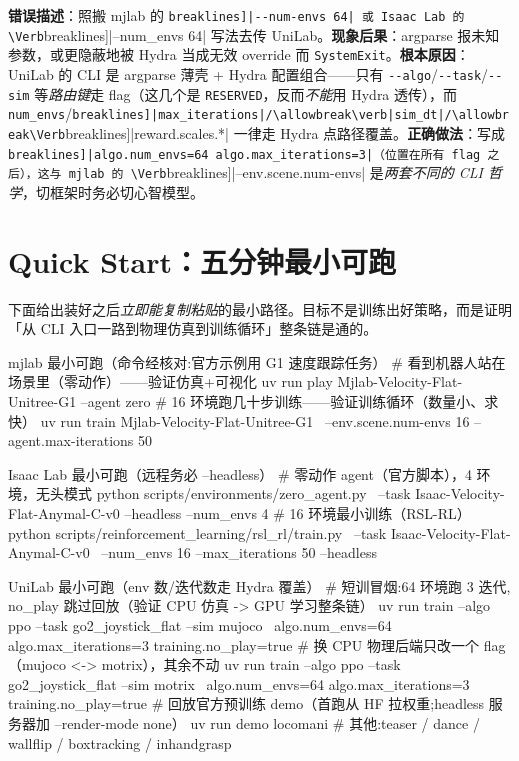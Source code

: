 \begin{pitfall}
\textbf{错误描述}：照搬 mjlab 的 \Verb[breaklines]|--num-envs 64| 或 Isaac Lab 的 \Verb[breaklines]|--num_envs 64| 写法去传 UniLab。\textbf{现象后果}：argparse 报未知参数，或更隐蔽地被 Hydra 当成无效 override 而 \verb|SystemExit|。\textbf{根本原因}：UniLab 的 CLI 是 argparse 薄壳 + Hydra 配置组合——只有 \verb|--algo|/\allowbreak\verb|--task|/\allowbreak\verb|--sim| 等\emph{路由键}走 flag（这几个是 \texttt{RESERVED}，反而\emph{不能}用 Hydra 透传），而 \verb|num_envs|/\allowbreak\Verb[breaklines]|max_iterations|/\allowbreak\verb|sim_dt|/\allowbreak\Verb[breaklines]|reward.scales.*| 一律走 Hydra 点路径覆盖。\textbf{正确做法}：写成 \Verb[breaklines]|algo.num_envs=64 algo.max_iterations=3|（位置在所有 flag 之后），这与 mjlab 的 \Verb[breaklines]|--env.scene.num-envs| 是\emph{两套不同的 CLI 哲学}，切框架时务必切心智模型。
\end{pitfall}

\section{Quick Start：五分钟最小可跑}
\label{sec:rlmc-setup-quickstart}

下面给出装好之后\emph{立即能复制粘贴}的最小路径。目标不是训练出好策略，而是证明「从 CLI 入口一路到物理仿真到训练循环」整条链是通的。

\begin{codebox}[bash]{mjlab 最小可跑（命令经核对:官方示例用 G1 速度跟踪任务）}
# 看到机器人站在场景里（零动作）——验证仿真+可视化
uv run play Mjlab-Velocity-Flat-Unitree-G1 --agent zero
# 16 环境跑几十步训练——验证训练循环（数量小、求快）
uv run train Mjlab-Velocity-Flat-Unitree-G1 \
    --env.scene.num-envs 16 --agent.max-iterations 50
\end{codebox}

\begin{codebox}[bash]{Isaac Lab 最小可跑（远程务必 --headless）}
# 零动作 agent（官方脚本），4 环境，无头模式
python scripts/environments/zero_agent.py \
    --task Isaac-Velocity-Flat-Anymal-C-v0 --headless --num_envs 4
# 16 环境最小训练（RSL-RL）
python scripts/reinforcement_learning/rsl_rl/train.py \
    --task Isaac-Velocity-Flat-Anymal-C-v0 \
    --num_envs 16 --max_iterations 50 --headless
\end{codebox}

\begin{codebox}[bash]{UniLab 最小可跑（env 数/迭代数走 Hydra 覆盖）}
# 短训冒烟:64 环境跑 3 迭代, no_play 跳过回放（验证 CPU 仿真 -> GPU 学习整条链）
uv run train --algo ppo --task go2_joystick_flat --sim mujoco \
    algo.num_envs=64 algo.max_iterations=3 training.no_play=true
# 换 CPU 物理后端只改一个 flag（mujoco <-> motrix），其余不动
uv run train --algo ppo --task go2_joystick_flat --sim motrix \
    algo.num_envs=64 algo.max_iterations=3 training.no_play=true
# 回放官方预训练 demo（首跑从 HF 拉权重;headless 服务器加 --render-mode none）
uv run demo locomani         # 其他:teaser / dance / wallflip / boxtracking / inhandgrasp
\end{codebox}

